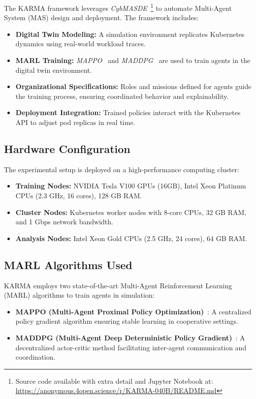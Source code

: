 \documentclass[conference]{IEEEtran}
\begin{document}
The KARMA framework leverages \textit{CybMASDE}~\footnote{Source code available with extra detail and Jupyter Notebook at: \url{https://anonymous.4open.science/r/KARMA-040B/README.md}} to automate Multi-Agent System (MAS) design and deployment. The framework includes:
\begin{itemize}
    \item \textbf{Digital Twin Modeling:} A simulation environment replicates Kubernetes dynamics using real-world workload traces.
    \item \textbf{MARL Training:} \textit{MAPPO}~\cite{yu2021mappo} and \textit{MADDPG}~\cite{lowe2017multi} are used to train agents in the digital twin environment.
    \item \textbf{Organizational Specifications:} Roles and missions defined for agents guide the training process, ensuring coordinated behavior and explainability.
    \item \textbf{Deployment Integration:} Trained policies interact with the Kubernetes API to adjust pod replicas in real time.
\end{itemize}

\subsection{Hardware Configuration}

The experimental setup is deployed on a high-performance computing cluster:
\begin{itemize}
    \item \textbf{Training Nodes:} NVIDIA Tesla V100 GPUs (16GB), Intel Xeon Platinum CPUs (2.3 GHz, 16 cores), 128 GB RAM.
    \item \textbf{Cluster Nodes:} Kubernetes worker nodes with 8-core CPUs, 32 GB RAM, and 1 Gbps network bandwidth.
    \item \textbf{Analysis Nodes:} Intel Xeon Gold CPUs (2.5 GHz, 24 cores), 64 GB RAM.
\end{itemize}

\subsection{MARL Algorithms Used}

KARMA employs two state-of-the-art Multi-Agent Reinforcement Learning (MARL) algorithms to train agents in simulation:
\begin{itemize}
    \item \textbf{MAPPO (Multi-Agent Proximal Policy Optimization)}~\cite{yu2021mappo}: A centralized policy gradient algorithm ensuring stable learning in cooperative settings.
    \item \textbf{MADDPG (Multi-Agent Deep Deterministic Policy Gradient)}~\cite{lowe2017multi}: A decentralized actor-critic method facilitating inter-agent communication and coordination.
\end{itemize}
\end{document}
